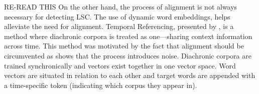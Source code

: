 RE-READ THIS
On the other hand, the process of alignment is not always necessary for detecting LSC. The use of dynamic word embeddings, helps alleviate the need for alignment. Temporal Referencing, presented by \citet{dubossarsky-etal-2019-time}, is a method where diachronic corpora is treated as one—sharing context information across time. This method was motivated by the fact that alignment should be circumvented as \citet{dubossarsky-etal-2017-outta} shows that the process introduces noise.  Diachronic corpora are trained synchronically and vectors exist together in one vector space. Word vectors are situated in relation to each other and target words are appended with a time-specific token (indicating which corpus they appear in).